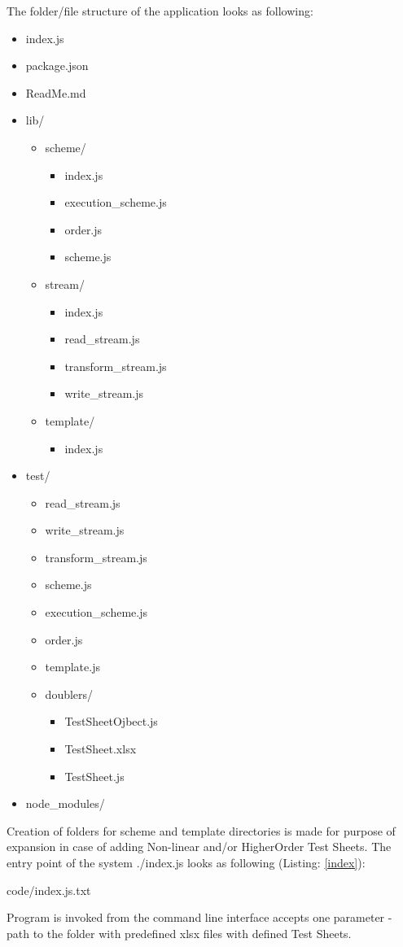The folder/file structure of the application looks as following:
\begin{itemize}
	\item index.js
	\item package.json
	\item ReadMe.md
	\item lib/
	\begin{itemize}
		\item scheme/
		\begin{itemize}
			\item index.js
			\item execution\_scheme.js
			\item order.js
			\item scheme.js
		\end{itemize}
		\item stream/
		\begin{itemize}
			\item index.js
			\item read\_stream.js
			\item transform\_stream.js
			\item write\_stream.js
		\end{itemize}
		\item template/
		\begin{itemize}
			\item index.js
		\end{itemize}
	\end{itemize}
	\item test/
	\begin{itemize}
		\item read\_stream.js
		\item write\_stream.js
		\item transform\_stream.js
		\item scheme.js
		\item execution\_scheme.js
		\item order.js
		\item template.js
		\item doublers/
		\begin{itemize}
			\item TestSheetOjbect.js
			\item TestSheet.xlsx
			\item TestSheet.js
		\end{itemize}
	\end{itemize}
	\item node\_modules/
\end{itemize}
Creation of folders for scheme and template directories is made for purpose of expansion in case of adding Non-linear and/or HigherOrder Test Sheets. 
The entry point of the system ./index.js looks as following (Listing: \ref{index}):


{code/index.js.txt}

Program is invoked from the command line interface accepts one parameter - path to the folder with predefined xlsx files with defined Test Sheets.
